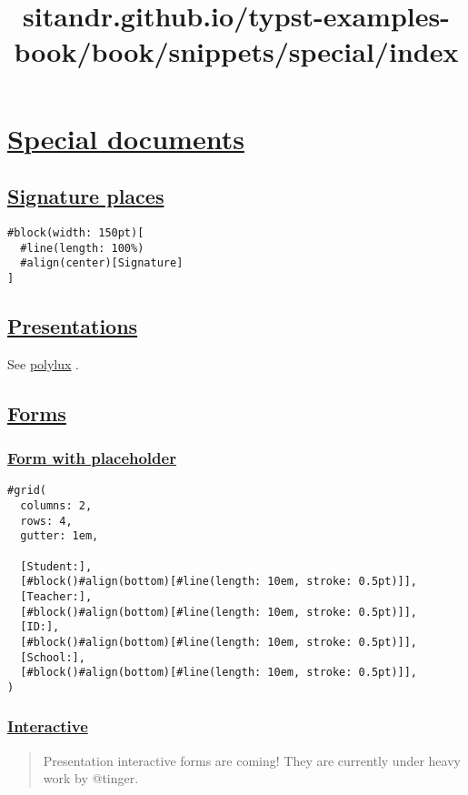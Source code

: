 \title{sitandr.github.io/typst-examples-book/book/snippets/special/index}

\section{\texorpdfstring{\hyperref[special-documents]{Special
documents}}{Special documents}}\label{special-documents}

\subsection{\texorpdfstring{\hyperref[signature-places]{Signature
places}}{Signature places}}\label{signature-places}

\begin{verbatim}
#block(width: 150pt)[
  #line(length: 100%)
  #align(center)[Signature]
]
\end{verbatim}

\pandocbounded{}

\subsection{\texorpdfstring{\hyperref[presentations]{Presentations}}{Presentations}}\label{presentations}

See \href{../../packages/}{polylux} .

\subsection{\texorpdfstring{\hyperref[forms]{Forms}}{Forms}}\label{forms}

\subsubsection{\texorpdfstring{\hyperref[form-with-placeholder]{Form
with placeholder}}{Form with placeholder}}\label{form-with-placeholder}

\begin{verbatim}
#grid(
  columns: 2,
  rows: 4,
  gutter: 1em,

  [Student:],
  [#block()#align(bottom)[#line(length: 10em, stroke: 0.5pt)]],
  [Teacher:],
  [#block()#align(bottom)[#line(length: 10em, stroke: 0.5pt)]],
  [ID:],
  [#block()#align(bottom)[#line(length: 10em, stroke: 0.5pt)]],
  [School:],
  [#block()#align(bottom)[#line(length: 10em, stroke: 0.5pt)]],
)
\end{verbatim}

\pandocbounded{}

\subsubsection{\texorpdfstring{\hyperref[interactive]{Interactive}}{Interactive}}\label{interactive}

\begin{quote}
Presentation interactive forms are coming! They are currently under
heavy work by @tinger.
\end{quote}
